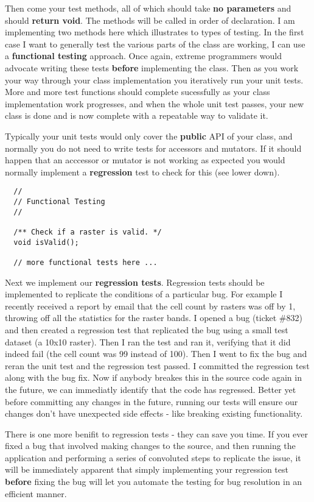 Then come your test methods, all of which should take \textbf{no parameters} and
should \textbf{return void}. The methods will be called in order of declaration.  I
am implementing two methods here which illustrates to types of testing. In the
first case I want to generally test the various parts of the class are working,
I can use a \textbf{functional testing} approach. Once again, extreme programmers
would advocate writing these tests \textbf{before} implementing the class. Then as
you work your way through your class implementation you iteratively run your
unit tests. More and more test functions should complete sucessfully as your
class implementation work progresses, and when the whole unit test passes, your
new class is done and is now complete with a repeatable way to validate it.

Typically your unit tests would only cover the \textbf{public} API of your class,
and normally you do not need to write tests for accessors and mutators.  If it
should happen that an acccessor or mutator is not working as expected you would
normally implement a \textbf{regression} test to check for this (see lower down).

\begin{verbatim}
  //
  // Functional Testing
  //
  
  /** Check if a raster is valid. */
  void isValid();

  // more functional tests here ...
\end{verbatim}

Next we implement our \textbf{regression tests}. Regression tests should be
implemented to replicate the conditions of a particular bug. For example I
recently received a report by email that the cell count by rasters was off by
1, throwing off all the statistics for the raster bands. I opened a bug (ticket
\#832) and then created a regression test that replicated the bug using a small
test dataset (a 10x10 raster). Then I ran the test and ran it, verifying that
it did indeed fail (the cell count was 99 instead of 100). Then I went to fix
the bug and reran the unit test and the regression test passed. I committed the
regression test along with the bug fix. Now if anybody breakes this in the
source code again in the future, we can immediatly identify that the code has
regressed. Better yet before committing any changes in the future, running our
tests will ensure our changes don't have unexpected side effects - like breaking
existing functionality.

There is one more benifit to regression tests - they can save you time.  If you
ever fixed a bug that involved making changes to the source, and then running
the application and performing a series of convoluted steps to replicate the
issue, it will be immediately apparent that simply implementing your regression
test \textbf{before} fixing the bug will let you automate the testing for bug
resolution in an efficient manner.

